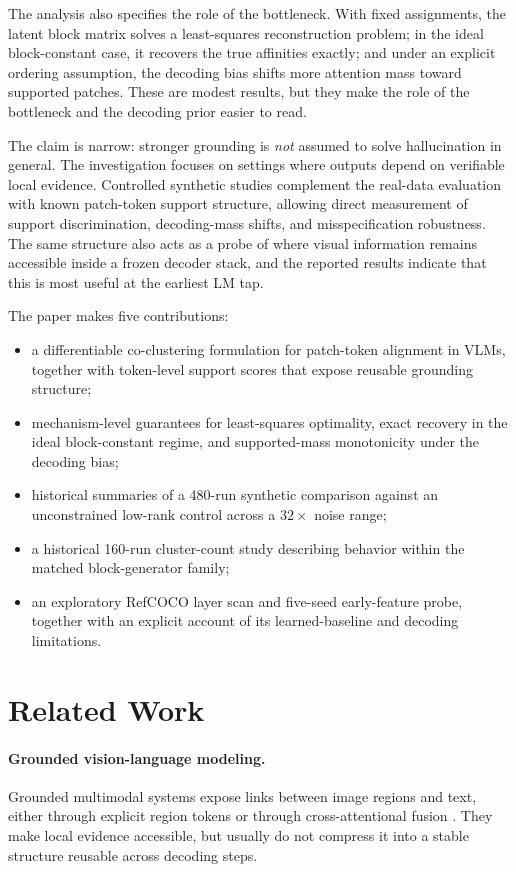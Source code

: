 \documentclass[11pt,a4paper]{article}
\begin{document}
The analysis also specifies the role of the bottleneck. With fixed assignments, the latent block matrix solves a least-squares reconstruction problem; in the ideal block-constant case, it recovers the true affinities exactly; and under an explicit ordering assumption, the decoding bias shifts more attention mass toward supported patches. These are modest results, but they make the role of the bottleneck and the decoding prior easier to read.

The claim is narrow: stronger grounding is \emph{not} assumed to solve hallucination in general. The investigation focuses on settings where outputs depend on verifiable local evidence. Controlled synthetic studies complement the real-data evaluation with known patch-token support structure, allowing direct measurement of support discrimination, decoding-mass shifts, and misspecification robustness. The same structure also acts as a probe of where visual information remains accessible inside a frozen decoder stack, and the reported results indicate that this is most useful at the earliest LM tap.

The paper makes five contributions:
\begin{itemize}
    \item a differentiable co-clustering formulation for patch-token alignment in VLMs, together with token-level support scores that expose reusable grounding structure;
    \item mechanism-level guarantees for least-squares optimality, exact recovery in the ideal block-constant regime, and supported-mass monotonicity under the decoding bias;
    \item historical summaries of a 480-run synthetic comparison against an unconstrained low-rank control across a $32\times$ noise range;
    \item a historical 160-run cluster-count study describing behavior within the matched block-generator family;
    \item an exploratory RefCOCO layer scan and five-seed early-feature probe, together with an explicit account of its learned-baseline and decoding limitations.
\end{itemize}

\section{Related Work}
\label{sec:related}

\paragraph{Grounded vision-language modeling.}
Grounded multimodal systems expose links between image regions and text, either through explicit region tokens or through cross-attentional fusion \cite{li2023blip2,microsoft2023kosmos2,liu2024llava}. They make local evidence accessible, but usually do not compress it into a stable structure reusable across decoding steps.
\end{document}
